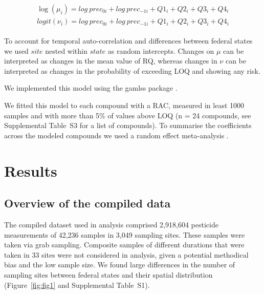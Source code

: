 \documentclass[journal=esthag,manuscript=article]{achemso}
\begin{document}
\begin{align}
\begin{split}
\log(\mu_{i}) = log~prec_{0 i} + log~prec_{-1 i} + Q1_{i} + Q2_{i}+Q3_{i}+Q4_{i}\\
logit(\nu_{i}) = log~prec_{0 i} + log~prec_{-1 i} + Q1_{i} + Q2_{i}+Q3_{i}+Q4_{i}
\end{split}
\label{eqn:eqn4}
\end{align}

To account for temporal auto-correlation and differences between federal states we used $site$ nested within $state$ as random intercepts.
Changes on $\mu$ can be interpreted as changes in the mean value of RQ, whereas changes in $\nu$ can be interpreted as changes in the probability of exceeding LOQ and showing any risk. 

We implemented this model using the gamlss package \cite{stasinopoulos_generalized_2007}.

We fitted this model to each compound with a RAC, measured in least 1000 samples and with more than 5\% of values above LOQ (n = 24 compounds, see Supplemental Table~S3 for a list of compounds). 
To summarise the coefficients across the modeled compounds we used a random effect meta-analysis \citep{harrison_getting_2011}.




\section{Results}
\subsection{Overview of the compiled data}


The compiled dataset used in analysis comprised 2,918,604 pesticide measurements of 42,236 samples in 3,049 sampling sites.  %
These samples were taken via grab sampling.  %
Composite samples of different durations that were taken in 33 sites were not considered in analysis, given a potential methodical bias and the low sample size.
We found large differences in the number of sampling sites between federal states and their spatial distribution (Figure~\ref{fig:fig1} and Supplemental Table~S1).
\end{document}
